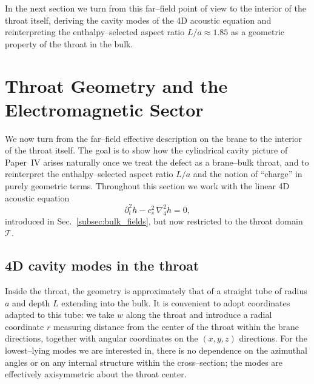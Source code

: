 \documentclass[12pt]{article}
\begin{document}
In the next section we turn from this far--field point of view to the
interior of the throat itself, deriving the cavity modes of the 4D acoustic
equation and reinterpreting the enthalpy--selected aspect ratio
$L/a \approx 1.85$ as a geometric property of the throat in the bulk.

\section{Throat Geometry and the Electromagnetic Sector}
\label{sec:throat_em}

We now turn from the far--field effective description on the brane to the
interior of the throat itself.  The goal is to show how the cylindrical
cavity picture of Paper~IV arises naturally once we treat the defect as a
brane--bulk throat, and to reinterpret the enthalpy--selected aspect ratio
$L/a$ and the notion of ``charge'' in purely geometric terms.  Throughout
this section we work with the linear 4D acoustic equation
\begin{equation}
  \partial_t^2 h
  - c_s^2 \,\nabla_4^2 h
  = 0,
  \label{eq:4d_acoustic_recall}
\end{equation}
introduced in Sec.~\ref{subsec:bulk_fields}, but now restricted to the
throat domain $\mathcal{T}$.

\subsection{4D cavity modes in the throat}
\label{subsec:throat_modes}

Inside the throat, the geometry is approximately that of a straight tube of
radius $a$ and depth $L$ extending into the bulk.  It is convenient to adopt
coordinates adapted to this tube: we take $w$ along the throat and introduce
a radial coordinate $r$ measuring distance from the center of the throat
within the brane directions, together with angular coordinates on the
$(x,y,z)$ directions.  For the lowest--lying modes we are interested in,
there is no dependence on the azimuthal angles or on any internal structure
within the cross--section; the modes are effectively axisymmetric about the
throat center.
\end{document}
